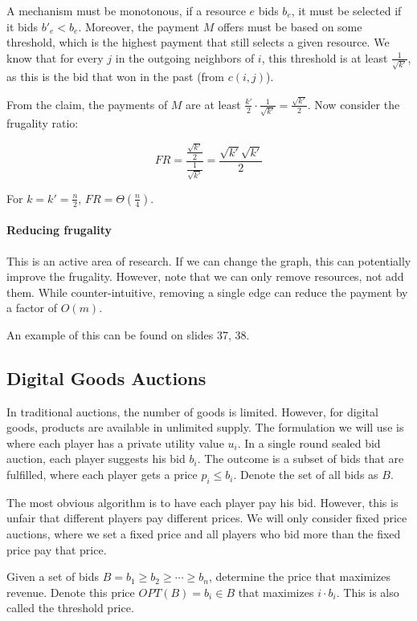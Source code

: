 \documentclass{idc_msc}
\begin{document}
A mechanism must be monotonous, if a resource \(e\) bids \(b_e\), it must be selected if it bids \(b'_e < b_e\).
Moreover, the payment \(M\) offers must be based on some threshold, which is the highest payment that still selects a given resource.
We know that for every \(j\) in the outgoing neighbors of \(i\), this threshold is at least \(\frac{1}{\sqrt{k'}}\), as this is the bid that won in the past (from \(c(i,j)\)).

From the claim, the payments of \(M\) are at least \(\frac{k'}{2} \cdot \frac{1}{\sqrt{k'}} = \frac{\sqrt{k'}}{2}\).
Now consider the frugality ratio:

\[FR = \frac{\frac{\sqrt{k'}}{2}}{\frac{1}{\sqrt{k'}}} = \frac{\sqrt{k'} \sqrt{k'}}{2}\]

For \(k = k' = \frac{n}{2}\), \(FR = \Theta(\frac{n}{4})\).

\paragraph{Reducing frugality}

This is an active area of research.
If we can change the graph, this can potentially improve the frugality.
However, note that we can only remove resources, not add them.
While counter-intuitive, removing a single edge can reduce the payment by a factor of \(O(m)\).

An example of this can be found on slides 37, 38.

\subsection{Digital Goods Auctions}

In traditional auctions, the number of goods is limited.
However, for digital goods, products are available in unlimited supply.
The formulation we will use is where each player has a private utility value \(u_i\).
In a single round sealed bid auction, each player suggests his bid \(b_i\).
The outcome is a subset of bids that are fulfilled, where each player gets a price \(p_i \le b_i\).
Denote the set of all bids as \(B\).

The most obvious algorithm is to have each player pay his bid.
However, this is unfair that different players pay different prices.
We will only consider fixed price auctions, where we set a fixed price and all players who bid more than the fixed price pay that price.

Given a set of bids \(B = b_1 \ge b_2 \ge \cdots \ge b_n \), determine the price that maximizes revenue.
Denote this price \(OPT(B) = b_i \in B\) that maximizes \(i \cdot b_i\).
This is also called the threshold price.
\end{document}

